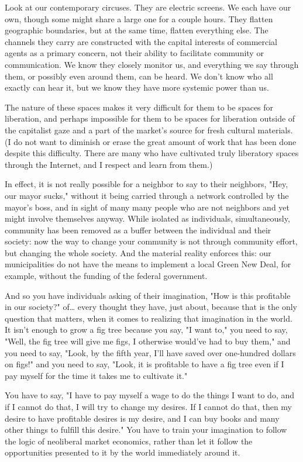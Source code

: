 \documentclass[11pt]{article}
\begin{document}
\begin{itemize}
Look at our contemporary circuses. They are electric screens. We each have our own, though some might share a large one for a couple hours. They flatten geographic boundaries, but at the same time, flatten everything else. The channels they carry are constructed with the capital interests of commercial agents as a primary concern, not their ability to facilitate community or communication. We know they closely monitor us, and everything we say through them, or possibly even around them, can be heard. We don't know who all exactly can hear it, but we know they have more systemic power than us.

The nature of these spaces makes it very difficult for them to be spaces for liberation, and perhaps impossible for them to be spaces for liberation outside of the capitalist gaze and a part of the market's source for fresh cultural materials. (I do not want to diminish or erase the great amount of work that has been done despite this difficulty. There are many who have cultivated truly liberatory spaces through the Internet, and I respect and learn from them.)

In effect, it is not really possible for a neighbor to say to their neighbors, "Hey, our mayor sucks," without it being carried through a network controlled by the mayor's boss, and in sight of many many people who are not neighbors and yet might involve themselves anyway. While isolated as individuals, simultaneously, community has been removed as a buffer between the individual and their society: now the way to change your community is not through community effort, but changing the whole society. And the material reality enforces this: our municipalities do not have the means to implement a local Green New Deal, for example, without the funding of the federal government.

And so you have individuals asking of their imagination, "How is this profitable in our society?" of\ldots{} every thought they have, just about, because that is the only question that matters, when it comes to realizing that imagination in the world. It isn't enough to grow a fig tree because you say, "I want to," you need to say, "Well, the fig tree will give me figs, I otherwise would've had to buy them," and you need to say, "Look, by the fifth year, I'll have saved over one-hundred dollars on figs!" and you need to say, "Look, it is profitable to have a fig tree even if I pay myself for the time it takes me to cultivate it."

You have to say, "I have to pay myself a wage to do the things I want to do, and if I cannot do that, I will try to change my desires. If I cannot do that, then my desire to have profitable desires is my desire, and I can buy books and many other things to fulfill this desire." You have to train your imagination to follow the logic of neoliberal market economics, rather than let it follow the opportunities presented to it by the world immediately around it.


\end{itemize}
\end{document}
